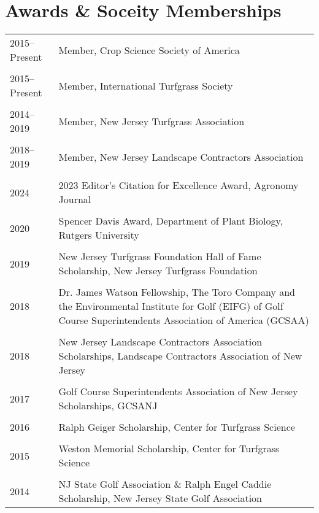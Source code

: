 \documentclass[letterpaper,11pt, english]{article}
\begin{document}
\section{Awards \& Soceity Memberships}
\begin{flushleft}
\begin{tabularx}{\textwidth}{@{}lX@{}}
    2015--Present \hspace{0.5cm} & Member, Crop Science Society of America \\
    \\[-0.2cm] 
    2015--Present & Member, International Turfgrass Society \\
    \\[-0.2cm] 
    2014--2019  & Member, New Jersey Turfgrass Association \\
    \\[-0.2cm] 
    2018--2019  & Member, New Jersey Landscape Contractors Association \\
    \\[-0.2cm] 
    2024 \hspace{1cm} & 2023 Editor’s Citation for Excellence Award, Agronomy Journal \\
    \\[-0.2cm] 
    2020 \hspace{1cm} & Spencer Davis Award, Department of Plant Biology, Rutgers University \\
    \\[-0.2cm] 
    2019 \hspace{1cm} & New Jersey Turfgrass Foundation Hall of Fame Scholarship, New Jersey Turfgrass Foundation \\
    \\[-0.2cm] 
    2018 \hspace{1cm} & Dr. James Watson Fellowship, The Toro Company and the Environmental Institute for Golf (EIFG) of Golf Course Superintendents Association of America (GCSAA) \\
    \\[-0.2cm] 
    2018 \hspace{1cm} & New Jersey Landscape Contractors Association Scholarships, Landscape Contractors Association of New Jersey \\
    \\[-0.2cm] 
    2017 \hspace{1cm} & Golf Course Superintendents Association of New Jersey Scholarships, GCSANJ \\
    \\[-0.2cm] 
    2016 \hspace{1cm} & Ralph Geiger Scholarship, Center for Turfgrass Science \\
    \\[-0.2cm] 
    2015 \hspace{1cm} & Weston Memorial Scholarship, Center for Turfgrass Science \\
    \\[-0.2cm] 
    2014 \hspace{1cm} & NJ State Golf Association \& Ralph Engel Caddie Scholarship, New Jersey State Golf Association \\
  \end{tabularx}
\end{flushleft}
\end{document}
